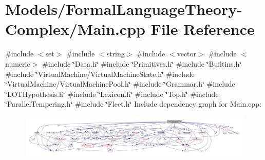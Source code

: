 \hypertarget{_models_2_formal_language_theory-_complex_2_main_8cpp}{}\section{Models/\+Formal\+Language\+Theory-\/\+Complex/\+Main.cpp File Reference}
\label{_models_2_formal_language_theory-_complex_2_main_8cpp}
{\ttfamily \#include $<$set$>$}\newline
{\ttfamily \#include $<$string$>$}\newline
{\ttfamily \#include $<$vector$>$}\newline
{\ttfamily \#include $<$numeric$>$}\newline
{\ttfamily \#include \char`\"{}Data.\+h\char`\"{}}\newline
{\ttfamily \#include \char`\"{}Primitives.\+h\char`\"{}}\newline
{\ttfamily \#include \char`\"{}Builtins.\+h\char`\"{}}\newline
{\ttfamily \#include \char`\"{}Virtual\+Machine/\+Virtual\+Machine\+State.\+h\char`\"{}}\newline
{\ttfamily \#include \char`\"{}Virtual\+Machine/\+Virtual\+Machine\+Pool.\+h\char`\"{}}\newline
{\ttfamily \#include \char`\"{}Grammar.\+h\char`\"{}}\newline
{\ttfamily \#include \char`\"{}L\+O\+T\+Hypothesis.\+h\char`\"{}}\newline
{\ttfamily \#include \char`\"{}Lexicon.\+h\char`\"{}}\newline
{\ttfamily \#include \char`\"{}Top.\+h\char`\"{}}\newline
{\ttfamily \#include \char`\"{}Parallel\+Tempering.\+h\char`\"{}}\newline
{\ttfamily \#include \char`\"{}Fleet.\+h\char`\"{}}\newline
Include dependency graph for Main.\+cpp\+:
\nopagebreak
\begin{figure}[H]
\begin{center}
\leavevmode
\includegraphics[width=350pt]{_models_2_formal_language_theory-_complex_2_main_8cpp__incl}
\end{center}
\end{figure}
